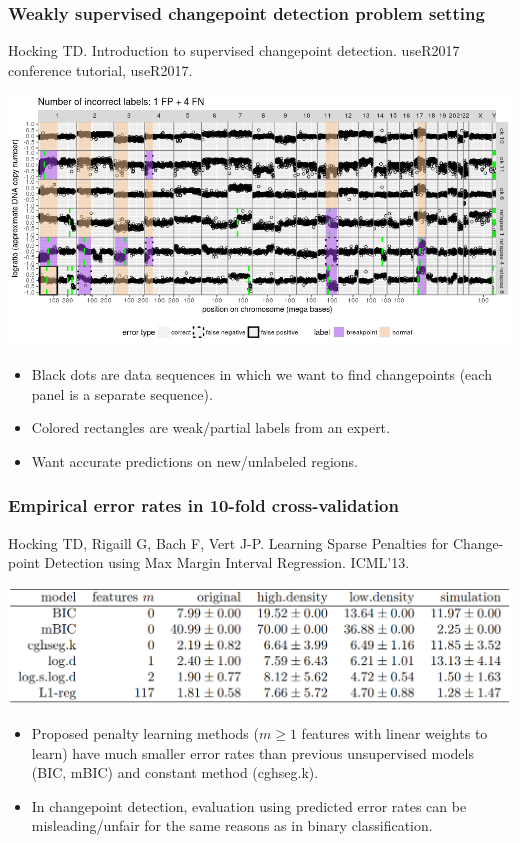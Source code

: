 \documentclass[t]{beamer}
\begin{document}
\begin{frame}
  \frametitle{Weakly supervised changepoint detection problem setting}

  {\scriptsize Hocking TD. Introduction to supervised changepoint
    detection. useR2017 conference tutorial, useR2017.}

  \includegraphics[width=\textwidth]{neuroblastoma-ok-relapse-supervised}

  \begin{itemize}
  \item Black dots are data sequences in which we want to find
    changepoints (each panel is a separate sequence).
  \item Colored rectangles are weak/partial labels from an expert.
  \item Want accurate predictions on new/unlabeled regions.
  \end{itemize}
\end{frame}

\begin{frame}
  \frametitle{Empirical error rates in 10-fold cross-validation}
  {\scriptsize Hocking TD, Rigaill G, Bach F, Vert J-P. Learning Sparse Penalties
  for Change-point Detection using Max Margin Interval
  Regression. ICML'13.}

  \includegraphics[width=\textwidth]{table-ICML13-error-rates}

  \begin{itemize}
  \item   Proposed penalty learning methods ($m\geq 1$ features with linear
  weights to learn) have much smaller error rates than previous
  unsupervised models (BIC, mBIC) and constant method (cghseg.k).
\item In changepoint detection, evaluation using predicted error rates
  can be misleading/unfair for the same reasons as in binary classification.
  \end{itemize}
\end{frame}
\end{document}
